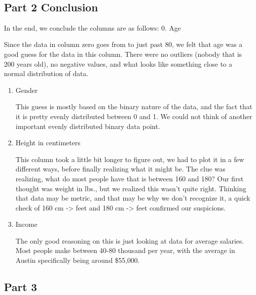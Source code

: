 \documentclass[11pt]{article}
\providecommand{\tightlist}{%
      \setlength{\itemsep}{0pt}\setlength{\parskip}{0pt}}
\begin{document}
    \begin{center}
    \end{center}
    { \hspace*{\fill} \\}
    
    \subsection{Part 2 Conclusion}\label{part-2-conclusion}

In the end, we conclude the columns are as follows: 0. Age

Since the data in column zero goes from to just past 80, we felt that
age was a good guess for the data in this column. There were no outliers
(nobody that is 200 years old), no negative values, and what looks like
something close to a normal distribution of data.

\begin{enumerate}
\def\labelenumi{\arabic{enumi}.}
\tightlist
\item
  Gender

  This guess is mostly based on the binary nature of the data, and the
  fact that it is pretty evenly distributed between 0 and 1. We could
  not think of another important evenly distributed binary data point.
\item
  Height in centimeters

  This column took a little bit longer to figure out, we had to plot it
  in a few different ways, before finally realizing what it might be.
  The clue was realizing, what do most people have that is between 160
  and 180? Our first thought was weight in lbs., but we realized this
  wasn't quite right. Thinking that data may be metric, and that may be
  why we don't recognize it, a quick check of 160 cm -\textgreater{}
  feet and 180 cm -\textgreater{} feet confirmed our suspicions.
\item
  Income

  The only good reasoning on this is just looking at data for average
  salaries. Most people make between 40-80 thousand per year, with the
  average in Austin specifically being around \$55,000.
\end{enumerate}

    \subsection{Part 3}\label{part-3}
\end{document}
